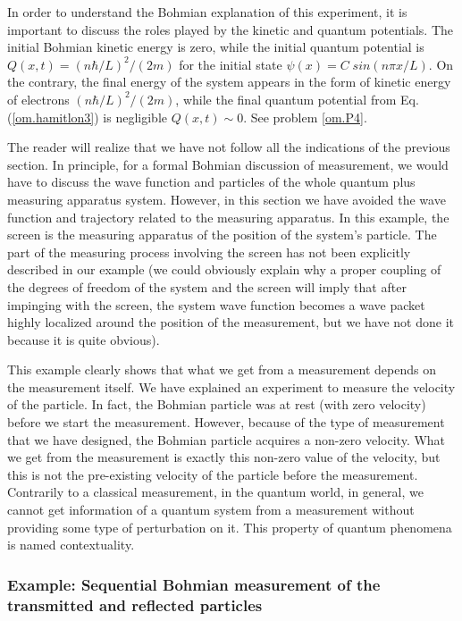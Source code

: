 \documentclass[nofootinbib, secnumarabic, amsmath, nobibnotes,10pt,aps,pra]{revtex4-1}
\newcommand{\eref}[1]{Eq. (\ref{#1})}
\begin{document}
In order to understand the Bohmian explanation of this experiment, it is important to discuss the roles played by the kinetic and quantum potentials. The initial Bohmian kinetic energy is zero, while the initial quantum potential is $Q(x,t) = (n\hbar/L)^{2}/(2m)$ for the initial state $\psi(x) = C \; sin(n \pi x/L)$. On the contrary, the final energy of the system appears in the form of kinetic energy of electrons $(n\hbar/L)^{2}/(2m)$, while the final quantum potential from \eref{om.hamitlon3} is negligible $Q(x,t)\sim 0$. See problem \ref{om.P4}.

The reader will realize that we have not follow all the indications of the previous section. In principle, for a formal Bohmian
discussion of measurement, we would have to discuss the wave function and particles of the whole quantum plus measuring apparatus system. However, in this section we have avoided the wave function and trajectory related to the measuring apparatus. In this example, the screen is the measuring apparatus of the position of the system's particle. The part of the measuring process involving the screen has not been explicitly described in our example (we could obviously explain why a proper coupling of the degrees of freedom of the system and the screen will imply that after impinging with the screen, the system wave function becomes a wave packet highly localized around the position of the measurement, but we have not done it because it is quite obvious). 

This example clearly shows that what we get from a measurement depends on the measurement itself. We have explained an experiment to measure the velocity of the particle. In fact, the Bohmian particle was at rest (with zero velocity) before we start the measurement. However, because of the type of measurement that we have designed, the Bohmian particle acquires a non-zero velocity. What we get from the measurement is exactly this non-zero value of the velocity, but this is not the pre-existing velocity of the particle before the measurement. Contrarily to a classical measurement, in the quantum world, in general, we cannot get information of a quantum system from a  measurement without providing some type of perturbation on it. This property of quantum phenomena is named contextuality. 

\enlargethispage{13pt}
\subsubsection{Example: Sequential Bohmian measurement of the transmitted and reflected particles}
\label{om.measure_transmission}
\end{document}
